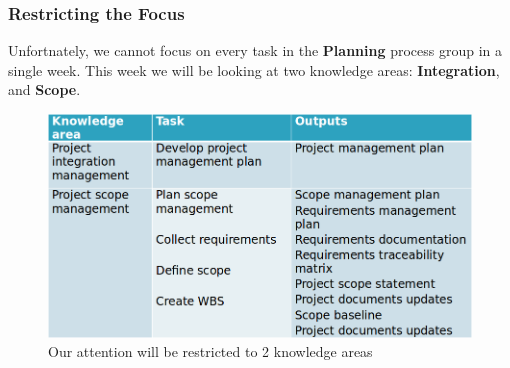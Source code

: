 \documentclass[aspectratio=169]{beamer}
\begin{document}
\begin{frame}
\frametitle{Restricting the Focus}
Unfortnately, we cannot focus on every task in the \textbf{Planning} process group in a single week. This week we will be looking at two knowledge areas: \textbf{Integration}, and \textbf{Scope}.

\begin{figure}
\includegraphics[scale=0.4]{planning_proc}
\caption{Our attention will be restricted to 2 knowledge areas}
\end{figure}
\end{frame}
\end{document}
